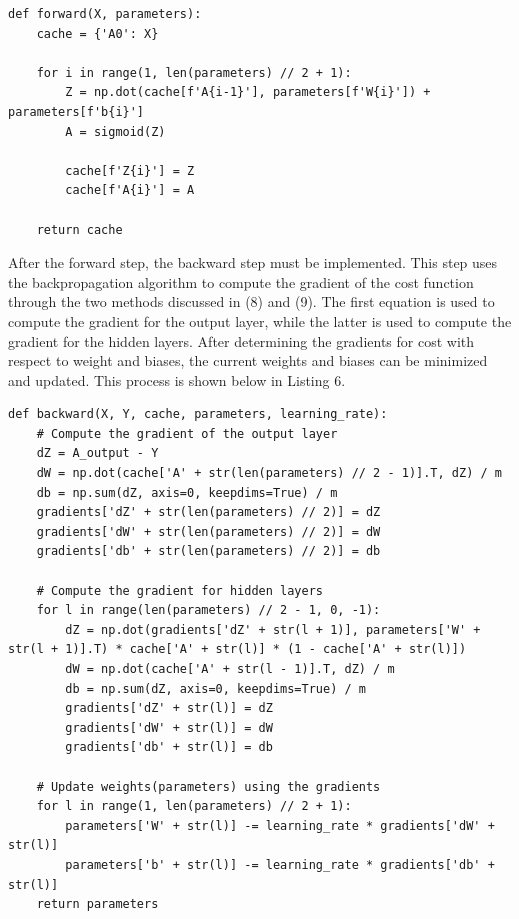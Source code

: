 \documentclass[twocolumn]{article}
\begin{document}
\begin{lstlisting}[caption={The Feed-Forward function, calculating pre-activation, Z, and activation, A.},captionpos=b]
    def forward(X, parameters):
    cache = {'A0': X}

    for i in range(1, len(parameters) // 2 + 1):
        Z = np.dot(cache[f'A{i-1}'], parameters[f'W{i}']) + parameters[f'b{i}']
        A = sigmoid(Z)
        
        cache[f'Z{i}'] = Z
        cache[f'A{i}'] = A

    return cache
\end{lstlisting}
After the forward step, the backward step must be implemented. This step uses the backpropagation algorithm to compute the gradient of the cost function through the two methods discussed in (8) and (9). The first equation is used to compute the gradient for the output layer, while the latter is used to compute the gradient for the hidden layers. After determining the gradients for cost with respect to weight and biases, the current weights and biases can be minimized and updated. This process is shown below in Listing 6. 
\begin{lstlisting}[caption={Computing the updated weights and biases using the Backpropagation function. Note some non-essential code has been removed but this should not hinder understanding.},captionpos=b]
    def backward(X, Y, cache, parameters, learning_rate):
    # Compute the gradient of the output layer
    dZ = A_output - Y
    dW = np.dot(cache['A' + str(len(parameters) // 2 - 1)].T, dZ) / m
    db = np.sum(dZ, axis=0, keepdims=True) / m
    gradients['dZ' + str(len(parameters) // 2)] = dZ
    gradients['dW' + str(len(parameters) // 2)] = dW
    gradients['db' + str(len(parameters) // 2)] = db

    # Compute the gradient for hidden layers
    for l in range(len(parameters) // 2 - 1, 0, -1):
        dZ = np.dot(gradients['dZ' + str(l + 1)], parameters['W' + str(l + 1)].T) * cache['A' + str(l)] * (1 - cache['A' + str(l)])
        dW = np.dot(cache['A' + str(l - 1)].T, dZ) / m
        db = np.sum(dZ, axis=0, keepdims=True) / m
        gradients['dZ' + str(l)] = dZ
        gradients['dW' + str(l)] = dW
        gradients['db' + str(l)] = db

    # Update weights(parameters) using the gradients
    for l in range(1, len(parameters) // 2 + 1):
        parameters['W' + str(l)] -= learning_rate * gradients['dW' + str(l)]
        parameters['b' + str(l)] -= learning_rate * gradients['db' + str(l)]
    return parameters
\end{lstlisting}
\end{document}
